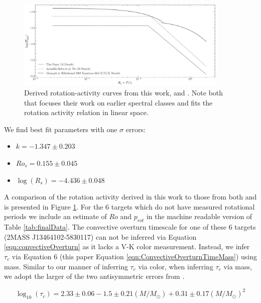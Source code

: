 \begin{figure}
    \centering
    \includegraphics[width=0.9\textwidth]{figures/magActivity/RpHKvsR0_MC_fits.pdf}
	\caption{Derived rotation-activity curves from this work, \citet{Def17} and
	\citet{Mamajek2008}. Note both that \citet{Mamajek2008} focuses their work
	on earlier spectral classes and fits the rotation activity relation in
	linear space.}
    \label{fig:RpHKvsRossbyFits}
\end{figure}

We find best fit parameters with one $\sigma$ errors:
\begin{itemize}
    \item $k = -1.347\pm 0.203$
    \item $Ro_{s} =  0.155\pm0.045$
    \item $\log(R_{s}) = -4.436\pm0.048$

\end{itemize}
A comparison of the rotation activity derived in this work to those
from both \citet{Def17} and \citet{Mamajek2008} is presented in Figure
\ref{fig:RpHKvsRossbyFits}. For the 6 targets which do not have measured
rotational periods we include an estimate of $Ro$ and $p_{rot}$ in the machine
readable version of Table \ref{tab:finalData}. The convective overturn
timescale for one of these 6 targets (2MASS J13464102-5830117) can not be
inferred via Equation \ref{eqn:convectiveOverturn} as it lacks a V-K color
measurement. Instead, we infer $\tau_{c}$ via \citet{Wri18} Equation 6 (this
paper Equation \ref{eqn:ConvectiveOverturnTimeMass}) using mass. Similar to our
manner of inferring $\tau_{c}$ via color, when inferring $\tau_c$ via mass, we
adopt the larger of the two antisymmetric errors from \citet{Wri18}.

\begin{equation}\label{eqn:ConvectiveOverturnTimeMass}
	\log_{10}(\tau_{c}) = 2.33\pm0.06 - 1.5\pm0.21\left(M/M_{\odot}\right) + 0.31\pm0.17\left(M/M_{\odot}\right)^{2}
\end{equation}


